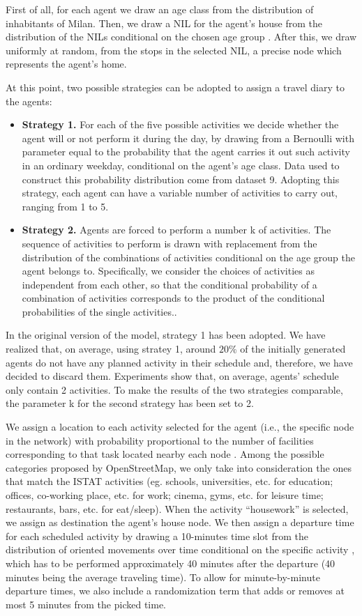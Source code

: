 First of all, for each agent we draw an age class from the distribution of inhabitants of Milan. Then, we draw a NIL for the agent's house from the distribution of the NILs conditional on the chosen age group \cite{site18}. After this, we draw uniformly at random, from the stops in the selected NIL, a precise node which represents the agent’s home. 

At this point, two possible strategies can be adopted to assign a travel diary to the agents:
\begin{itemize}
    \item \textbf{Strategy 1.} For each of the five possible activities we decide whether the agent will or not perform it during the day, by drawing from a Bernoulli with parameter equal to the probability that the agent carries it out such activity in an ordinary weekday, conditional on the agent's age class. Data used to construct this probability distribution come from dataset 9. Adopting this strategy, each agent can have a variable number of activities to carry out, ranging from 1 to 5.
    \item \textbf{Strategy 2.} Agents are forced to perform a number k of activities. The sequence of activities to perform is  drawn with replacement from the distribution of the combinations of activities conditional on the age group the agent belongs to. Specifically, we consider the choices of activities as independent from each other, so that the conditional probability of a combination of activities corresponds to the product of the conditional probabilities of the single activities..
\end{itemize}
In the original version of the model, strategy 1 has been adopted. We have realized that, on average, using stratey 1, around $20\%$ of the initially generated agents do not have any planned activity in their schedule and, therefore, we have decided to discard them. Experiments show that, on average, agents' schedule only contain 2 activities. To make the results of the two strategies comparable, the parameter k for the second strategy has been set to 2.

We assign a location to each activity selected for the agent (i.e., the specific node in the network) with probability proportional to the number of facilities corresponding to that task located nearby each node \cite{site9}. Among the possible categories proposed by OpenStreetMap, we only take into consideration the ones that match the ISTAT activities (eg. schools, universities, etc. for education; offices, co-working place, etc. for work; cinema, gyms, etc. for leisure time; restaurants, bars, etc. for eat/sleep). When the activity “housework” is selected, we assign as destination the agent’s house node. We then assign a departure time for each scheduled activity by drawing a 10-minutes time slot from the distribution of oriented movements over time conditional on the specific activity \cite{site11}, which has to be performed approximately 40 minutes after the departure (40 minutes being the average traveling time). To allow for minute-by-minute departure times, we also include a randomization term that adds or removes at most 5 minutes from the picked time. 

